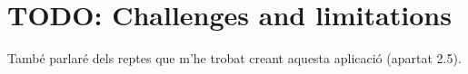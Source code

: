 
\section{TODO: Challenges and limitations}

També parlaré dels reptes que m'he trobat creant aquesta aplicació (apartat
2.5).